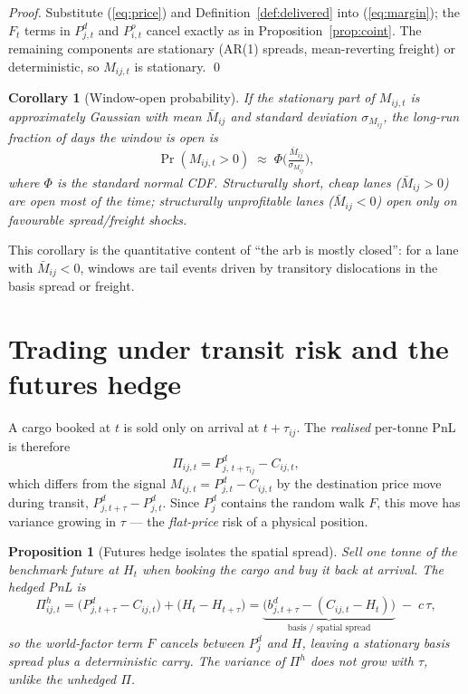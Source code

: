 \documentclass[11pt]{article}
\theoremstyle{definition}
\theoremstyle{plain}
\newtheorem{proposition}{Proposition}
\newtheorem{corollary}{Corollary}
\begin{document}
\begin{proof}
Substitute (\ref{eq:price}) and Definition~\ref{def:delivered} into
(\ref{eq:margin}); the $F_t$ terms in $P^d_{j,t}$ and $P^o_{i,t}$ cancel exactly
as in Proposition~\ref{prop:coint}. The remaining components are stationary
(AR(1) spreads, mean-reverting freight) or deterministic, so $M_{ij,t}$ is
stationary. \qed
\end{proof}

\begin{corollary}[Window-open probability]
If the stationary part of $M_{ij,t}$ is approximately Gaussian with mean
$\bar M_{ij}$ and standard deviation $\sigma_{M_{ij}}$, the long-run fraction of
days the window is open is
\begin{equation}
\Pr(M_{ij,t}>0)\;\approx\;\Phi\!\Big(\tfrac{\bar M_{ij}}{\sigma_{M_{ij}}}\Big),
\end{equation}
where $\Phi$ is the standard normal CDF. Structurally short, cheap lanes
($\bar M_{ij}>0$) are open most of the time; structurally unprofitable lanes
($\bar M_{ij}<0$) open only on favourable spread/freight shocks.
\end{corollary}

This corollary is the quantitative content of ``the arb is mostly closed'': for
a lane with $\bar M_{ij}<0$, windows are tail events driven by transitory
dislocations in the basis spread or freight.

\section{Trading under transit risk and the futures hedge}
\label{sec:risk}

A cargo booked at $t$ is sold only on arrival at $t+\tau_{ij}$. The
\emph{realised} per-tonne PnL is therefore
\begin{equation}
\Pi_{ij,t}=P^d_{j,\,t+\tau_{ij}}-C_{ij,t},
\end{equation}
which differs from the signal $M_{ij,t}=P^d_{j,t}-C_{ij,t}$ by the destination
price move during transit, $P^d_{j,t+\tau}-P^d_{j,t}$. Since $P^d_j$ contains
the random walk $F$, this move has variance growing in $\tau$ --- the
\emph{flat-price} risk of a physical position.

\begin{proposition}[Futures hedge isolates the spatial spread]
\label{prop:hedge}
Sell one tonne of the benchmark future at $H_t$ when booking the cargo and buy
it back at arrival. The hedged PnL is
\begin{equation}
\Pi^{h}_{ij,t}=\bigl(P^d_{j,t+\tau}-C_{ij,t}\bigr)+\bigl(H_t-H_{t+\tau}\bigr)
= \underbrace{\bigl(b^d_{j,t+\tau}-(C_{ij,t}-H_t)\bigr)}_{\text{basis / spatial spread}}
\;-\;c\,\tau,
\end{equation}
so the world-factor term $F$ cancels between $P^d_j$ and $H$, leaving a
stationary basis spread plus a deterministic carry. The variance of $\Pi^h$ does
\emph{not} grow with $\tau$, unlike the unhedged $\Pi$.
\end{proposition}
\end{document}
